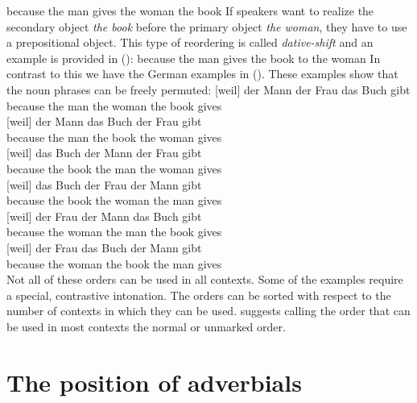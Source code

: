 \ea
because the man gives the woman the book 
\z
If speakers want to realize the secondary object \emph{the book} before the primary object \emph{the
  woman}, they have to use a prepositional object. This type of reordering is called
\emph{dative-shift} and an example is provided in ():
\ea
because the man gives the book to the woman 
\z
In contrast to this we have the German examples in (). These examples show that the noun
phrases can be freely permuted:
\eal
\ex 
\gll {}[weil]          der Mann der Frau das Buch gibt\\
     \spacebr{}because the man the woman the book gives\\
\ex 
\gll {}[weil]          der Mann das Buch der Frau  gibt\\
     \spacebr{}because the man  the book the woman gives\\
\ex 
\gll {}[weil]          das Buch der Mann der Frau  gibt\\
     \spacebr{}because the book the man  the woman gives\\
\ex 
\gll {}[weil]          das Buch der Frau  der Mann gibt\\
     \spacebr{}because the book the woman the man  gives\\
\ex 
\gll {}[weil]          der Frau  der Mann das Buch gibt\\
     \spacebr{}because the woman the man  the book gives\\
\ex 
\gll {}[weil]          der Frau  das Buch der Mann gibt\\
     \spacebr{}because the woman the book the man  gives\\
\zl
Not all of these orders can be used in all contexts. Some of the examples require a special,
contrastive intonation. The orders can be sorted with respect to the number of contexts in which
they can be used. \citet{Hoehle82} suggests calling the order that can be used in most contexts the
normal or unmarked order.




\section{The position of adverbials}


